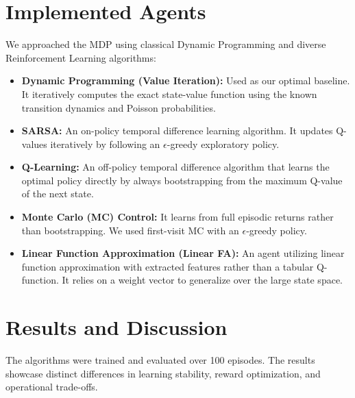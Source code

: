 \documentclass{article}
\begin{document}
\section{Implemented Agents}
We approached the MDP using classical Dynamic Programming and diverse Reinforcement Learning algorithms:
\begin{itemize}
    \item \textbf{Dynamic Programming (Value Iteration):} Used as our optimal baseline. It iteratively computes the exact state-value function using the known transition dynamics and Poisson probabilities.
    \item \textbf{SARSA:} An on-policy temporal difference learning algorithm. It updates Q-values iteratively by following an $\epsilon$-greedy exploratory policy.
    \item \textbf{Q-Learning:} An off-policy temporal difference algorithm that learns the optimal policy directly by always bootstrapping from the maximum Q-value of the next state.
    \item \textbf{Monte Carlo (MC) Control:} It learns from full episodic returns rather than bootstrapping. We used first-visit MC with an $\epsilon$-greedy policy.
    \item \textbf{Linear Function Approximation (Linear FA):} An agent utilizing linear function approximation with extracted features rather than a tabular Q-function. It relies on a weight vector to generalize over the large state space.
\end{itemize}

\section{Results and Discussion}
The algorithms were trained and evaluated over 100 episodes. The results showcase distinct differences in learning stability, reward optimization, and operational trade-offs.
\end{document}
